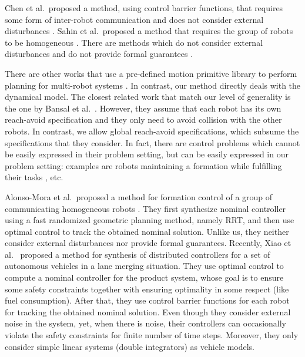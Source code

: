 Chen et al.\ proposed a method, using control barrier functions, that requires some form of inter-robot 
communication and does not consider external disturbances \cite{Chen2018cbf}.
Sahin et al.\ proposed a method that requires the group of robots to be homogeneous \cite{Shahin2017cltl}.
There are methods which do not consider external disturbances and do not provide formal guarantees \cite{jackson2020scalable}.

There are other works that use a pre-defined motion primitive library to perform planning for multi-robot 
systems \cite{saha2016implan,BanusicMPSZ19pgcd,Antlab,Drona}. 
In contrast, our method directly deals with the dynamical model. 
The closest related work that match our level of generality is the one by Bansal et al.\ \cite{bansal2017safe}.
However, they assume that each robot has its own reach-avoid specification and they only need to avoid collision with the other robots.
In contrast, we allow global reach-avoid specifications, which subsume the specifications that they consider.
In fact, there are control problems which cannot be easily expressed in their problem setting, but can be easily expressed in our problem setting: 
examples are robots maintaining a formation while fulfilling their tasks \cite{alonso2019distributed}, etc.

Alonso-Mora et al.\ proposed a method for formation control of a group of communicating homogeneous robots \cite{alonso2019distributed}.
They first synthesize nominal controller using a fast randomized geometric planning method, namely RRT, and 
then use optimal control to track the obtained nominal solution.
Unlike us, they neither consider external disturbances nor provide formal guarantees.
Recently, Xiao et al.\ \cite{xiao2019merging} proposed a method for synthesis of distributed controllers for a 
set of autonomous vehicles in a lane merging situation.
They use optimal control to compute a nominal controller for the product system, 
whose goal is to ensure some safety constraints together with ensuring optimality in some respect (like fuel consumption).
After that, they use control barrier functions for each robot for tracking the obtained nominal solution.
Even though they consider external noise in the system, yet, when there is noise, their controllers can 
occasionally violate the safety constraints for finite number of time steps.
Moreover, they only consider simple linear systems (double integrators) as vehicle models.
 

